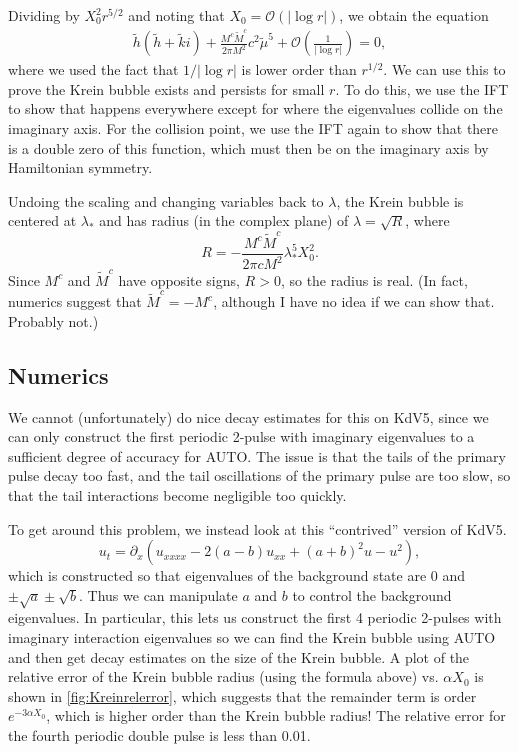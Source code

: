 \documentclass[10pt,reqno]{amsart}
\theoremstyle{plain}
\theoremstyle{definition}
\theoremstyle{remark}
\numberwithin{theorem}{section}
\numberwithin{equation}{section}
\begin{document}
Dividing by $X_0^2 r^{5/2}$ and noting that $X_0 = \mathcal{O}(|\log r|)$, we obtain the equation
\begin{equation}\label{det5}
\begin{aligned}
\tilde{h} ( \tilde{h}+ \tilde{k} i) 
+ \frac{M^c \tilde{M}^c }{2 \pi M^2 } c^2 \tilde{\mu}^5 + \mathcal{O}\left( \frac{1}{|\log r|} \right) = 0,
\end{aligned}
\end{equation}
where we used the fact that $1/|\log r|$ is lower order than $r^{1/2}$. We can use this to prove the Krein bubble exists and persists for small $r$. To do this, we use the IFT to show that happens everywhere except for where the eigenvalues collide on the imaginary axis. For the collision point, we use the IFT again to show that there is a double zero of this function, which must then be on the imaginary axis by Hamiltonian symmetry.

Undoing the scaling and changing variables back to $\lambda$, the Krein bubble is centered at $\lambda_*$ and has radius (in the complex plane) of $\lambda = \sqrt{R}$, where 
\begin{equation}\label{Kreinrad}
R = -\frac{M^c \tilde{M}^c }{2 \pi c M^2 } \lambda_*^5 X_0^2.
\end{equation}
Since $M^c$ and $\tilde{M}^c$ have opposite signs, $R > 0$, so the radius is real. (In fact, numerics suggest that $\tilde{M}^c = -M^c$, although I have no idea if we can show that. Probably not.) 

\subsection{Numerics}

We cannot (unfortunately) do nice decay estimates for this on KdV5, since we can only construct the first periodic 2-pulse with imaginary eigenvalues to a sufficient degree of accuracy for AUTO. The issue is that the tails of the primary pulse decay too fast, and the tail oscillations of the primary pulse are too slow, so that the tail interactions become negligible too quickly.

To get around this problem, we instead look at this ``contrived'' version of KdV5.
\begin{equation}\label{KdV5alt}
u_t = \partial_x\left( u_{xxxx} - 2(a-b)u_{xx} + (a+b)^2 u - u^2 \right),
\end{equation}
which is constructed so that eigenvalues of the background state are 0 and $\pm \sqrt{a} \pm \sqrt{b}$. Thus we can manipulate $a$ and $b$ to control the background eigenvalues. In particular, this lets us construct the first 4 periodic 2-pulses with imaginary interaction eigenvalues so we can find the Krein bubble using AUTO and then get decay estimates on the size of the Krein bubble. A plot of the relative error of the Krein bubble radius (using the formula above) vs. $\alpha X_0$ is shown in \cref{fig:Kreinrelerror}, which suggests that the remainder term is order $e^{-3 \alpha X_0}$, which is higher order than the Krein bubble radius! The relative error for the fourth periodic double pulse is less than 0.01.
\end{document}
